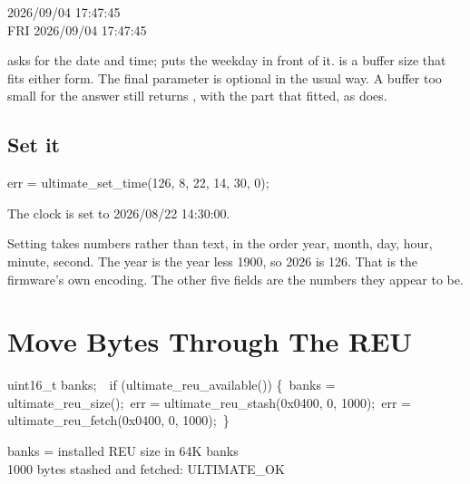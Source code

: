 \begin{outputbox}
2026/09/04 17:47:45\\
FRI 2026/09/04 17:47:45
\end{outputbox}

 asks for the date and time;
 puts the weekday in front of it.
 is a buffer size that fits either form. The final
parameter is optional in the usual way. A buffer too small for the answer
still returns , with the part that fitted, as
 does.

\subsection*{Set it}

\begin{listingbox}
err = ultimate\_set\_time(126, 8, 22, 14, 30, 0);
\end{listingbox}

\begin{resultbox}
The clock is set to 2026/08/22 14:30:00.
\end{resultbox}

Setting takes numbers rather than text, in the order year, month, day, hour,
minute, second. The year is the year less 1900, so 2026 is 126. That is the
firmware's own encoding. The other five fields are the numbers they appear to
be.


\section{Move Bytes Through The REU}

\begin{listingbox}
uint16\_t banks;\
\
if (ultimate\_reu\_available()) \{\
\hspace*{1em}banks = ultimate\_reu\_size();\
\hspace*{1em}err = ultimate\_reu\_stash(0x0400, 0, 1000);\
\hspace*{1em}err = ultimate\_reu\_fetch(0x0400, 0, 1000);\
\}
\end{listingbox}

\begin{resultbox}
banks = installed REU size in 64K banks\\
1000 bytes stashed and fetched: ULTIMATE_OK
\end{resultbox}


